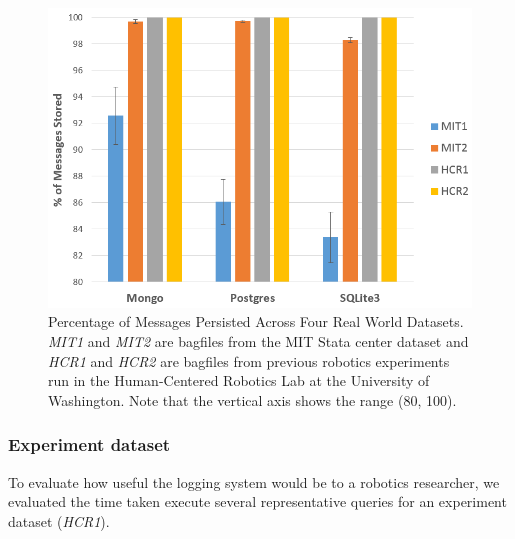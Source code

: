 \documentclass[nocopyrightspace]{acm_proc_article-sp}
\begin{document}
\begin{figure}
    \centering
    \includegraphics[width=\linewidth]{images/realworld}
    \caption{Percentage of Messages Persisted Across Four Real World Datasets. \textit{MIT1} and \textit{MIT2} are bagfiles from the MIT Stata center dataset and \textit{HCR1} and \textit{HCR2} are bagfiles from previous robotics experiments run in the Human-Centered Robotics Lab at the University of Washington. Note that the vertical axis shows the range (80, 100).}
    \label{fig:realworld}
\end{figure}

\subsubsection{Experiment dataset}
To evaluate how useful the logging system would be to a robotics researcher, we evaluated the time taken execute several representative queries for an experiment dataset (\textit{HCR1}).

\end{document}
